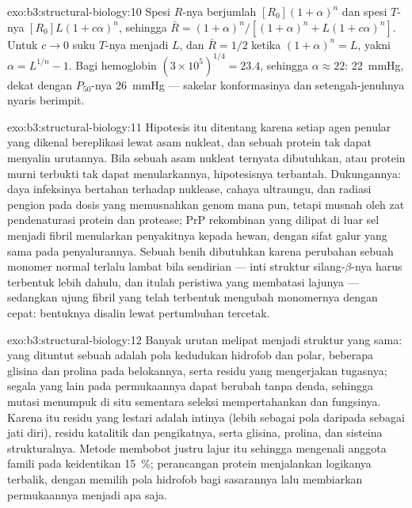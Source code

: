 \begin{solution}{exo:b3:structural-biology:10}
Spesi $R$-nya berjumlah $[R_{0}](1+\alpha)^{n}$ dan spesi $T$-nya
$[R_{0}]L(1+c\alpha)^{n}$, sehingga $\bar R = (1+\alpha)^{n}/[(1+\alpha)^{n}
+ L(1+c\alpha)^{n}]$. Untuk $c \to 0$ suku $T$-nya menjadi $L$, dan $\bar R =
1/2$ ketika $(1+\alpha)^{n} = L$, yakni $\alpha = L^{1/n} - 1$. Bagi
hemoglobin $(3\times 10^{5})^{1/4} = 23.4$, sehingga $\alpha \approx 22$:
\qty{22}{mmHg}, dekat dengan $P_{50}$-nya \qty{26}{mmHg} --- sakelar
konformasinya dan setengah-jenuhnya nyaris berimpit.
\end{solution}

\begin{solution}{exo:b3:structural-biology:11}
Hipotesis itu ditentang karena setiap agen penular yang dikenal bereplikasi
lewat asam nukleat, dan sebuah protein tak dapat menyalin urutannya. Bila
sebuah asam nukleat ternyata dibutuhkan, atau protein murni terbukti tak dapat
menularkannya, hipotesisnya terbantah. Dukungannya: daya infeksinya bertahan
terhadap nuklease, cahaya ultraungu, dan radiasi pengion pada dosis yang
memusnahkan genom mana pun, tetapi musnah oleh zat pendenaturasi protein dan
protease; PrP rekombinan yang dilipat di luar sel menjadi fibril menularkan
penyakitnya kepada hewan, dengan sifat galur yang sama pada penyalurannya.
Sebuah benih dibutuhkan karena perubahan sebuah monomer normal terlalu lambat
bila sendirian --- inti struktur silang-$\beta$-nya harus terbentuk lebih
dahulu, dan itulah peristiwa yang membatasi lajunya --- sedangkan ujung fibril
yang telah terbentuk mengubah monomernya dengan cepat: bentuknya disalin lewat
pertumbuhan tercetak.
\end{solution}

\begin{solution}{exo:b3:structural-biology:12}
Banyak urutan melipat menjadi struktur yang sama: yang dituntut sebuah 
adalah pola kedudukan hidrofob dan polar, beberapa glisina dan prolina
pada belokannya, serta residu yang mengerjakan tugasnya; segala yang lain pada
permukaannya dapat berubah tanpa denda, sehingga mutasi menumpuk di situ
sementara seleksi mempertahankan  dan fungsinya. Karena itu residu yang
lestari adalah intinya (lebih sebagai pola daripada sebagai jati diri), residu
katalitik dan pengikatnya, serta glisina, prolina, dan sisteina strukturalnya.
Metode  membobot justru lajur itu sehingga mengenali anggota famili pada
keidentikan \qty{15}{\%}; perancangan protein menjalankan logikanya terbalik,
dengan memilih pola hidrofob bagi  sasarannya lalu membiarkan
permukaannya menjadi apa saja.
\end{solution}

